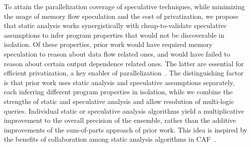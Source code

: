 To attain the parallelization coverage of speculative techniques, while
minimizing the usage of memory flow speculation and the cost of privatization,
we propose that static analysis works synergistically with cheap-to-validate
speculative assumptions to infer program properties that would not be
discoverable in isolation.
%
Of these properties, prior work would have required memory speculation to reason
about data flow related ones, and would have failed to reason about certain
output dependence related ones. The latter are essential for efficient
privatization, a key enabler of
parallelization~\cite{7,21,22,29,32_from_privateer}.
%
The distinguishing factor is that prior work uses static analysis and
speculative assumptions separately, each inferring different program properties
in isolation, while we combine the strengths of static and speculative analysis
and allow resolution of multi-logic queries.
%
Individual static or speculative analysis algorithms yield a multiplicative
improvement to the overall precision of the ensemble, rather than the additive
improvements of the sum-of-parts approach of prior work.
%
This idea is inspired by the benefits of collaboration among static analysis
algorithms in CAF~\cite{johnson:17:cgo}.



%
%
%

